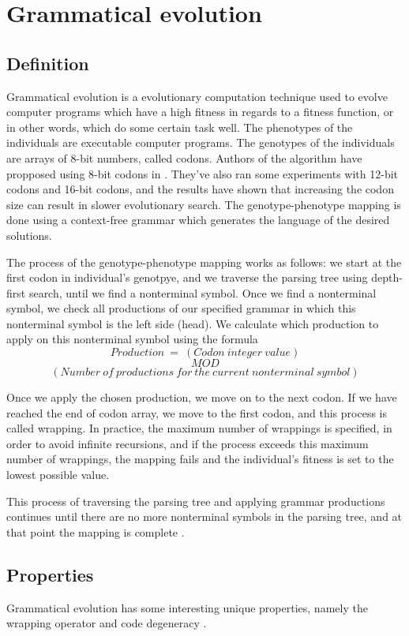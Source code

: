 \section{Grammatical evolution}
\subsection{Definition}
Grammatical evolution is a evolutionary computation technique used to evolve computer programs which have a high fitness in regards to a fitness function, or in other words, which do some certain task well. The phenotypes of the individuals are executable computer programs. The genotypes of the individuals are arrays of 8-bit numbers, called codons. Authors of the algorithm have propposed using 8-bit codons in \citep{neill2003grammaticalevolution}. They've also ran some experiments with 12-bit codons and 16-bit codons, and the results have shown that increasing the codon size can result in slower evolutionary search. The genotype-phenotype mapping is done using a context-free grammar which generates the language of the desired solutions.

The process of the genotype-phenotype mapping works as follows: we start at the first codon in individual's genotpye, and we traverse the parsing tree using depth-first search, until we find a nonterminal symbol. Once we find a nonterminal symbol, we check all productions of our specified grammar in which this nonterminal symbol is the left side (head). We calculate which production to apply on this nonterminal symbol using the formula
$$Production\:=\:(Codon\:integer\:value)$$
$$MOD$$ 
$$(Number\:of\:productions\:for\:the\:current\:nonterminal\:symbol)$$ 

Once we apply the chosen production, we move on to the next codon. If we have reached the end of codon array, we move to the first codon, and this process is called wrapping. In practice, the maximum number of wrappings is specified, in order to avoid infinite recursions, and if the process exceeds this maximum number of wrappings, the mapping fails and the individual's fitness is set to the lowest possible value.

This process of traversing the parsing tree and applying grammar productions continues until there are no more nonterminal symbols in the parsing tree, and at that point the mapping is complete \citep{neill2003grammaticalevolution}.

\subsection{Properties}
Grammatical evolution has some interesting unique properties, namely the wrapping operator and code degeneracy \citep{neill2003grammaticalevolution}. 


